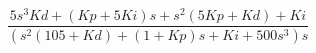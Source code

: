 \documentclass[12pt]{article}
\begin{document}
\begin{displaymath}
\frac{5  s^{3} Kd+ {(Kp+5 Ki)} s+ s^{2} {(5 Kp+Kd)}+Ki}{ {( s^{2} {(105+Kd)}+ {(1+Kp)} s+Ki+500 s^{3})} s}
\end{displaymath}
\end{document}
